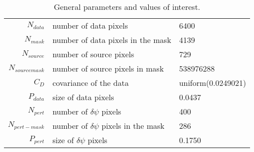 \begin{table*}[!htb]\caption{General parameters and values of interest.}\begin{center}\begin{tabular}{ r l l }\hline $N_{data}$        & number of data pixels             & 6400 \\ 
 $N_{mask}$        & number of data pixels in the mask & 4139 \\ 
 $N_{source}$      & number of source pixels           & 729 \\ 
 $N_{source mask}$ & number of source pixels in mask   & 538976288 \\ 
 $C_D$        & covariance of the data            & uniform(0.0249021) \\ 
 $P_{data}$   & size of data pixels               &     0.0437 \\ 
\hline  $N_{pert}$       & number of $\delta\psi$ pixels             & 400 \\ 
 $N_{pert-mask}$  & number of $\delta\psi$ pixels in the mask & 286 \\ 
 $P_{pert}$       & size of $\delta\psi$ pixels               &     0.1750 \\ 
\hline\end{tabular}\end{center}\label{tab:3}\end{table*}